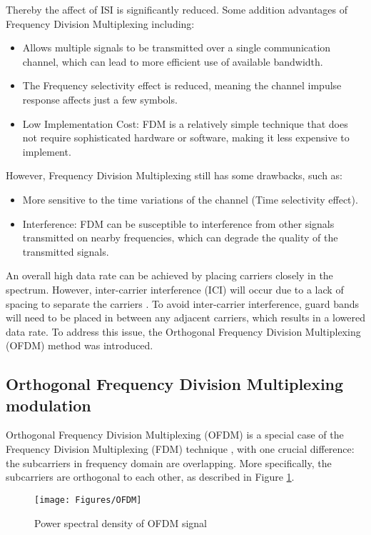 Thereby the affect of ISI is significantly reduced. Some addition advantages of Frequency Division Multiplexing including:
\begin{itemize}
    \item Allows multiple signals to be transmitted over a single communication channel, which can lead to more efficient use of available bandwidth.
    \item The Frequency selectivity effect is reduced, meaning the channel impulse response affects just a few symbols.
    \item Low Implementation Cost: FDM is a relatively simple technique that does not require sophisticated hardware or software, making it less expensive to implement.
\end{itemize}
However, Frequency Division Multiplexing still has some drawbacks, such as: 
\begin{itemize}
    \item More sensitive to the time variations of the channel (Time selectivity effect).
    \item Interference: FDM can be susceptible to interference from other signals transmitted on nearby frequencies, which can degrade the quality of the transmitted signals.
\end{itemize}

An overall high data rate can be achieved by placing carriers closely in the spectrum. However, inter-carrier interference (ICI) will occur due to a lack of spacing to separate the carriers \cite{ICI}. To avoid inter-carrier interference, guard bands will need to be placed in between any adjacent carriers, which results in a lowered data rate. To address this issue, the Orthogonal Frequency Division Multiplexing (OFDM) method was introduced.

\subsection{Orthogonal Frequency Division Multiplexing modulation}
Orthogonal Frequency Division Multiplexing (OFDM) is a special case of the Frequency Division Multiplexing (FDM) technique \cite{OFDM2010}, with one crucial difference: the subcarriers in frequency domain are overlapping. More specifically, the subcarriers are orthogonal to each other, as described in Figure \ref{fig:OFDM}.

\begin{figure}[htbp]
    \centering
    \texttt{[image: Figures/OFDM]}
    \caption{Power spectral density of OFDM signal}
    \label{fig:OFDM}
\end{figure}

